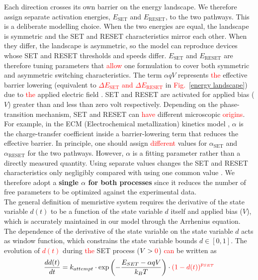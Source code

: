 \documentclass[aip,apl,reprint,floatfix]{revtex4-2}
\newcommand{\changed}[1]{\textcolor{red}{#1}}
\begin{document}
Each direction crosses its own barrier on the energy landscape. We therefore assign separate activation energies, $E_{\text{SET}}$ and $E_{\text{RESET}}$, to the two pathways. This is a deliberate modelling choice. When the two energies are equal, the landscape is symmetric and the SET and RESET characteristics mirror each other. When they differ, the landscape is asymmetric, so the model can reproduce devices whose SET and RESET thresholds and speeds differ. $E_{\text{SET}}$ and $E_{\text{RESET}}$ are therefore tuning parameters that \changed{allow} one formulation to cover both symmetric and asymmetric switching characteristics.
 The term $\alpha qV$ represents \changed{the} effective barrier lowering (equivalent to \changed{$\Delta E_{\text{SET}}$ and $\Delta E_{\text{RESET}}$} in \changed{Fig.~}\ref{energy landscape}) due to \changed{the} applied electric field \cite{Russo,Ielmini}. SET and RESET are activated for applied bias ($V$) greater than and less than zero volt respectively. Depending on the phase-transition mechanism, SET and RESET can \changed{have} different microscopic \changed{origins}. For example, in the ECM (Electrochemical metallization)  kinetics model \cite{Menzel}, $\alpha$ is the charge-transfer coefficient inside a barrier-lowering term that reduces the effective barrier. In principle, one should assign \changed{different} values for $\alpha_{\text{SET}}$ and $\alpha_{\text{RESET}}$ for the two pathways. However, $\alpha$ is a fitting parameter rather than a directly measured quantity. Using separate values changes the SET and RESET characteristics only negligibly compared with using one common value \cite{Ielmini}. We therefore adopt a \textbf{single $\alpha$ for both processes} since it reduces the number of free parameters to be optimized against the experimental data.
\\The general definition of memristive system requires the derivative of the state variable $d(t)$ to be a function of the state variable $d$ itself and applied bias ($V$), which is accurately maintained in our model through the Arrhenius equation. The dependence of the derivative of the state variable on the state variable $d$ acts as window function, which constrains the state variable bounds $d \in [0,1]$.
The evolution of \changed{$d(t)$} during \changed{the} SET process ($V > \changed{0}$) \changed{can} be written as
\begin{equation}
    \frac{dd(t)}{dt} = k_{attempt} \cdot \exp\left( -\frac{E_{SET} - \alpha qV}{k_B T} \right) \cdot \changed{\left(1 - d(t)\right)^{p_{SET}}}
    \label{eq:set}
\end{equation}
\end{document}
